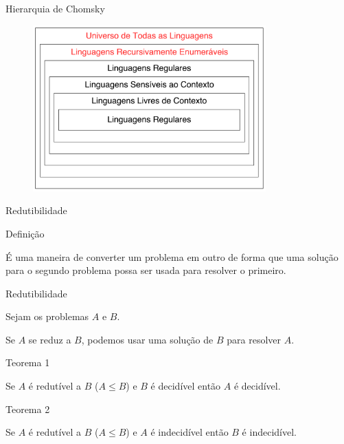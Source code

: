 \documentclass{beamer}
\begin{document}
  \begin{frame}{Hierarquia de Chomsky}

    \begin{figure}[ht]
      \includegraphics[width=0.80\textwidth]{img/hierarquia-Chomsky.pdf}
    \end{figure}

  \end{frame}

  \begin{frame}{Redutibilidade}

    \begin{block}{Definição}

      É uma maneira de converter um problema em outro de forma que uma solução para o segundo problema possa ser usada para resolver o primeiro.

    \end{block}

  \end{frame}

  \begin{frame}{Redutibilidade}

    Sejam os problemas $A$ e $B$.\newline

    Se $A$ se reduz a $B$, podemos usar uma solução de $B$ para resolver $A$.\newline

    \begin{block}{Teorema 1}

      Se $A$ é redutível a $B$ ($A \le B$) e $B$ é decidível então $A$ é decidível.

    \end{block}

    \begin{block}{Teorema 2}

      Se $A$ é redutível a $B$ ($A \le B$) e $A$ é indecidível então $B$ é indecidível.

    \end{block}

  \end{frame}
\end{document}
